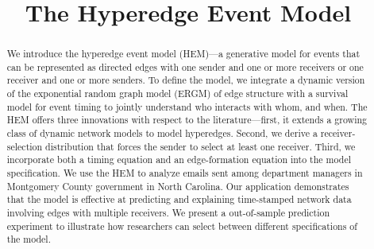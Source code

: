 \documentclass[ba]{imsart}
\numberwithin{equation}{section}
\theoremstyle{plain}
\begin{document}
\begin{frontmatter}
\title{The Hyperedge Event Model}


\begin{abstract}
We introduce the hyperedge event model (HEM)---a generative model for events that can be represented as directed edges with one sender and one or more receivers or one receiver and one or more senders. To define the model, we
integrate a dynamic version of the exponential random graph model (ERGM) of edge structure with a survival model for event timing to jointly understand who interacts with whom, and when. The HEM offers three innovations with respect to the literature---first, it extends a growing class of dynamic network models to model hyperedges. Second, we derive a receiver-selection distribution that forces the sender to select at least one receiver. Third, we incorporate both a timing equation and an edge-formation equation into the model specification. We use the HEM to analyze emails sent among department managers in Montgomery County government in North Carolina. Our application demonstrates that the model is effective at predicting and explaining time-stamped network data involving edges with multiple receivers. We present a out-of-sample prediction experiment to illustrate how researchers can select between different specifications of the model. 
\end{abstract}

\begin{keyword}[class=MSC]
\end{keyword}

\begin{keyword}
\end{keyword}

\end{frontmatter}
\end{document}
